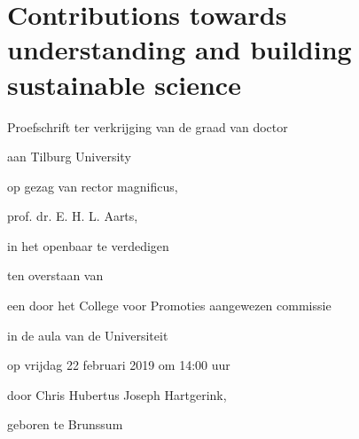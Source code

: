 \setcounter{secnumdepth}{2}
\usepackage{hyperref}
\def\UrlBreaks{\do\/\do-}

\maketitle
\section{Contributions towards understanding and building sustainable science}
\vfill
Proefschrift ter verkrijging van de graad van doctor
\par{aan Tilburg University }
\par{op gezag van rector magnificus, }
\par{prof. dr. E. H. L. Aarts, }
\par{in het openbaar te verdedigen }
\par{ten overstaan van}
\par{een door het College voor Promoties aangewezen commissie }
\par{in de aula van de Universiteit}
\par{op vrijdag 22 februari 2019 om 14:00 uur}
\par{door Chris Hubertus Joseph Hartgerink, }
\par{geboren te Brunssum}
